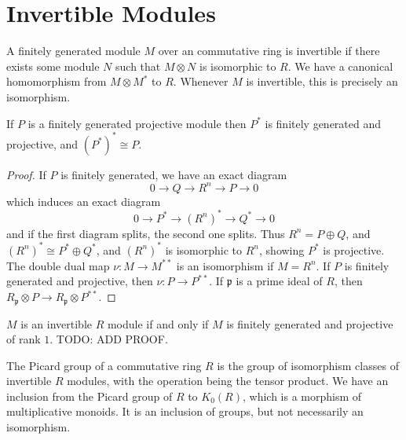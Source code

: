 \section{Invertible Modules}

A finitely generated module $M$ over an commutative ring is invertible if there exists some module $N$ such that $M \otimes N$ is isomorphic to $R$. We have a canonical homomorphism from $M \otimes M^*$ to $R$. Whenever $M$ is invertible, this is precisely an isomorphism.

\begin{lemma}
    If $P$ is a finitely generated projective module then $P^*$ is finitely generated and projective, and $(P^*)^* \cong P$.
\end{lemma}
\begin{proof}
    If $P$ is finitely generated, we have an exact diagram
    \[ 0 \to Q \to R^n \to P \to 0 \]
    which induces an exact diagram
    \[ 0 \to P^* \to (R^n)^* \to Q^* \to 0 \]
    and if the first diagram splits, the second one splits. Thus $R^n = P \oplus Q$, and $(R^n)^* \cong P^* \oplus Q^*$, and $(R^n)^*$ is isomorphic to $R^n$, showing $P^*$ is projective. The double dual map $\nu: M \to M^{**}$ is an isomorphism if $M = R^n$. If $P$ is finitely generated and projective, then $\nu: P \to P^{**}$. If $\mathfrak{p}$ is a prime ideal of $R$, then $R_{\mathfrak{p}} \otimes P \to R_{\mathfrak{p}} \otimes P^{**}$.
\end{proof}

$M$ is an invertible $R$ module if and only if $M$ is finitely generated and projective of rank $1$. TODO: ADD PROOF.

The Picard group of a commutative ring $R$ is the group of isomorphism classes of invertible $R$ modules, with the operation being the tensor product. We have an inclusion from the Picard group of $R$ to $K_0(R)$, which is a morphism of multiplicative monoids. It is an inclusion of groups, but not necessarily an isomorphism.


